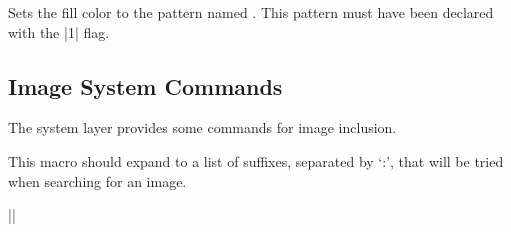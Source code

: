 \begin{command}{\pgfsys@setpatterncolored{}}
    Sets the fill color to the pattern named . This pattern must
    have been declared with the |1| flag.
\end{command}


\subsection{Image System Commands}

The system layer provides some commands for image inclusion.

\begin{command}{\pgfsys@imagesuffixlist}
    This macro should expand to a list of suffixes, separated by `:', that will
    be tried when searching for an image.

    \example |\def\pgfsys@imagesuffixlist{eps:epsi:ps}|
\end{command}


